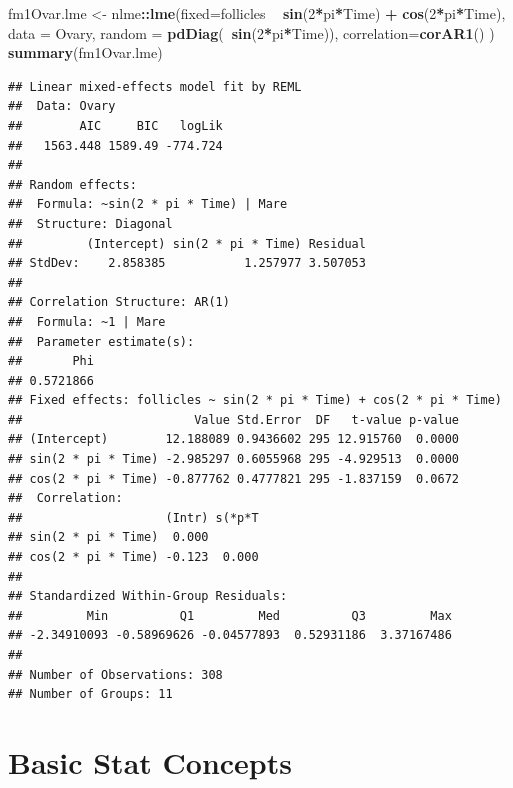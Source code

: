 \documentclass[]{book}
\newenvironment{Shaded}{\begin{snugshade}}{\end{snugshade}}
\newcommand{\DataTypeTok}[1]{\textcolor[rgb]{0.13,0.29,0.53}{#1}}
\newcommand{\DecValTok}[1]{\textcolor[rgb]{0.00,0.00,0.81}{#1}}
\newcommand{\KeywordTok}[1]{\textcolor[rgb]{0.13,0.29,0.53}{\textbf{#1}}}
\newcommand{\NormalTok}[1]{#1}
\newcommand{\OperatorTok}[1]{\textcolor[rgb]{0.81,0.36,0.00}{\textbf{#1}}}
\newcommand{\StringTok}[1]{\textcolor[rgb]{0.31,0.60,0.02}{#1}}
\begin{document}
\begin{Shaded}
\begin{Highlighting}[]
\NormalTok{fm1Ovar.lme <-}\StringTok{ }\NormalTok{nlme}\OperatorTok{::}\KeywordTok{lme}\NormalTok{(}\DataTypeTok{fixed=}\NormalTok{follicles }\OperatorTok{~}\StringTok{ }\KeywordTok{sin}\NormalTok{(}\DecValTok{2}\OperatorTok{*}\NormalTok{pi}\OperatorTok{*}\NormalTok{Time) }\OperatorTok{+}\StringTok{ }\KeywordTok{cos}\NormalTok{(}\DecValTok{2}\OperatorTok{*}\NormalTok{pi}\OperatorTok{*}\NormalTok{Time), }
                   \DataTypeTok{data =}\NormalTok{ Ovary, }
                   \DataTypeTok{random =} \KeywordTok{pdDiag}\NormalTok{(}\OperatorTok{~}\KeywordTok{sin}\NormalTok{(}\DecValTok{2}\OperatorTok{*}\NormalTok{pi}\OperatorTok{*}\NormalTok{Time)), }
                   \DataTypeTok{correlation=}\KeywordTok{corAR1}\NormalTok{() )}
\KeywordTok{summary}\NormalTok{(fm1Ovar.lme)}
\end{Highlighting}
\end{Shaded}

\begin{verbatim}
## Linear mixed-effects model fit by REML
##  Data: Ovary 
##        AIC     BIC   logLik
##   1563.448 1589.49 -774.724
## 
## Random effects:
##  Formula: ~sin(2 * pi * Time) | Mare
##  Structure: Diagonal
##         (Intercept) sin(2 * pi * Time) Residual
## StdDev:    2.858385           1.257977 3.507053
## 
## Correlation Structure: AR(1)
##  Formula: ~1 | Mare 
##  Parameter estimate(s):
##       Phi 
## 0.5721866 
## Fixed effects: follicles ~ sin(2 * pi * Time) + cos(2 * pi * Time) 
##                        Value Std.Error  DF   t-value p-value
## (Intercept)        12.188089 0.9436602 295 12.915760  0.0000
## sin(2 * pi * Time) -2.985297 0.6055968 295 -4.929513  0.0000
## cos(2 * pi * Time) -0.877762 0.4777821 295 -1.837159  0.0672
##  Correlation: 
##                    (Intr) s(*p*T
## sin(2 * pi * Time)  0.000       
## cos(2 * pi * Time) -0.123  0.000
## 
## Standardized Within-Group Residuals:
##         Min          Q1         Med          Q3         Max 
## -2.34910093 -0.58969626 -0.04577893  0.52931186  3.37167486 
## 
## Number of Observations: 308
## Number of Groups: 11
\end{verbatim}

\hypertarget{basic-stat-concepts}{%
\chapter{Basic Stat Concepts}\label{basic-stat-concepts}}
\end{document}
